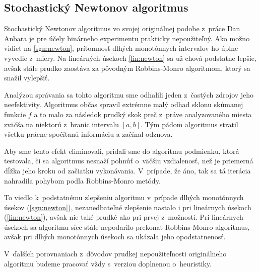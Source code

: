 \subsection{Stochastický Newtonov algoritmus}
Stochastický Newtonov algoritmus vo svojej originálnej podobe z~práce Dan
Anbara\cite{anbar} je pre účely binárneho experimentu prakticky nepoužiteľný.
Ako možno vidieť na \ref{sgn:newton}, prítomnosť dlhých monotónnych intervalov
ho úplne vyvedie z~miery. Na lineárných úsekoch \ref{lin:newton} sa už chová
podstatne lepšie, avšak stále prudko zaostáva za pôvodným Robbins-Monro
algoritmom, ktorý sa snažil vylepšiť. 

Analýzou správania sa tohto algoritmu sme odhalili jeden z~častých zdrojov jeho
neefektivity. Algoritmus občas spravil extrémne malý odhad sklonu skúmanej
funkcie $f$ a to malo za následok prudký skok preč z~práve analyzovaného miesta
zväčša na niektorú z~hraníc intervalu $[a,b]$. Tým pádom algoritmus stratil
všetku prácne spočítanú informáciu a začínal odznova.

Aby sme tento efekt eliminovali, pridali sme do algoritmu podmienku, ktorá
testovala, či sa algoritmus nesnaží pohnúť o~väčšiu vzdialenosť, než je
priemerná dĺžka jeho kroku od začiatku vykonávania. V~prípade, že áno, tak sa tá
iterácia nahradila pohybom podľa Robbins-Monro metódy.

To viedlo k~podstatnému zlepšeniu algoritmu v~prípade dlhých monotónnych úsekov
(\ref{sgn:newton}), nezanedbateľné zlepšenie nastalo i pri lineárnych úsekoch
(\ref{lin:newton}), avšak nie také prudké ako pri prvej z~možností. Pri
lineárnych úsekoch sa algoritmu síce stále nepodarilo prekonať Robbins-Monro
algoritmus, avšak pri dlhých monotónnych úsekoch sa ukázala jeho opodstatnenosť.

V~ďalších porovnaniach z~dôvodov prudkej nepoužiteľnosti originálneho algoritmu
budeme pracovať vždy s~verziou doplnenou o~heuristiky.


